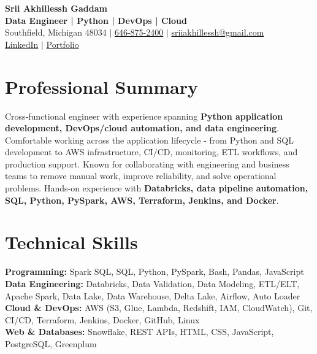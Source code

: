 \documentclass[letterpaper,10pt]{article}
\begin{document}
\fontsize{9.35pt}{10.45pt}\selectfont

\begin{center}
    {\LARGE \textbf{Srii Akhillessh Gaddam}} \\[-1pt]
    \textbf{Data Engineer | Python | DevOps | Cloud} \\[2pt]
    Southfield, Michigan 48034 $|$
    \href{tel:6468752400}{646-875-2400} $|$
    \href{mailto:sriiakhillessh@gmail.com}{sriiakhillessh@gmail.com} \\[1pt]
    \href{https://www.linkedin.com/in/srii-akhiilessh-gaddam-b48668191/}{LinkedIn} $|$
    \href{https://sriiakhillesshg.github.io/portfolio/}{Portfolio}
\end{center}
\vspace{-8pt}

\section{Professional Summary}
\small{Cross-functional engineer with experience spanning \textbf{Python application development, DevOps/cloud automation, and data engineering}. Comfortable working across the application lifecycle - from Python and SQL development to AWS infrastructure, CI/CD, monitoring, ETL workflows, and production support. Known for collaborating with engineering and business teams to remove manual work, improve reliability, and solve operational problems. Hands-on experience with \textbf{Databricks, data pipeline automation, SQL, Python, PySpark, AWS, Terraform, Jenkins, and Docker}.}

\section{Technical Skills}
\small{
\textbf{Programming:} Spark SQL, SQL, Python, PySpark, Bash, Pandas, JavaScript \\
\textbf{Data Engineering:} Databricks, Data Validation, Data Modeling, ETL/ELT, Apache Spark, Data Lake, Data Warehouse, Delta Lake, Airflow, Auto Loader \\
\textbf{Cloud \& DevOps:} AWS (S3, Glue, Lambda, Redshift, IAM, CloudWatch), Git, CI/CD, Terraform, Jenkins, Docker, GitHub, Linux \\
\textbf{Web \& Databases:} Snowflake, REST APIs, HTML, CSS, JavaScript, PostgreSQL, Greenplum
}
\end{document}
